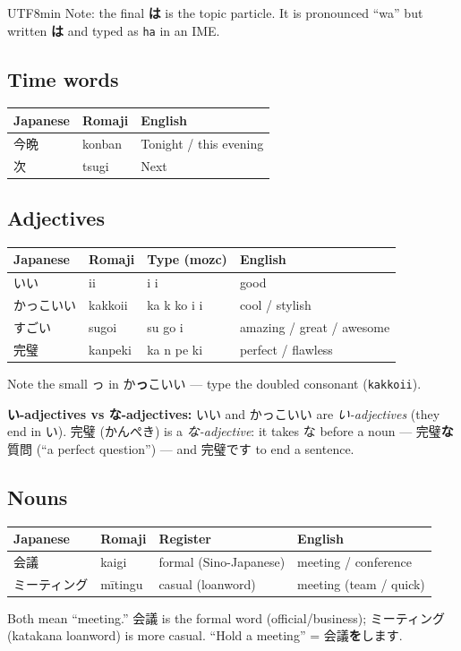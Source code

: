 \documentclass[11pt]{article}
\begin{document}
\begin{CJK}{UTF8}{min}
Note: the final \textbf{は} is the topic particle. It is pronounced ``wa'' but
written \textbf{は} and typed as \texttt{ha} in an IME.

\subsection{Time words}
\begin{center}
\begin{tabular}{@{}lll@{}}
\toprule
Japanese & Romaji & English \\
\midrule
今晩 & konban & Tonight / this evening \\
次   & tsugi  & Next \\
\bottomrule
\end{tabular}
\end{center}

\subsection{Adjectives}
\begin{center}
\begin{tabular}{@{}llll@{}}
\toprule
Japanese & Romaji & Type (mozc) & English \\
\midrule
いい     & ii      & i i        & good \\
かっこいい & kakkoii & ka k ko i i & cool / stylish \\
すごい   & sugoi   & su go i    & amazing / great / awesome \\
完璧     & kanpeki & ka n pe ki & perfect / flawless \\
\bottomrule
\end{tabular}
\end{center}
Note the small っ in か\textbf{っ}こいい --- type the doubled consonant
(\texttt{kakkoii}).

\textbf{い-adjectives vs な-adjectives:} いい and かっこいい are
\emph{い-adjectives} (they end in い). 完璧 (かんぺき) is a \emph{な-adjective}:
it takes な before a noun --- 完璧\textbf{な}質問 (``a perfect question'') --- and
完璧です to end a sentence.

\subsection{Nouns}
\begin{center}
\begin{tabular}{@{}llll@{}}
\toprule
Japanese & Romaji & Register & English \\
\midrule
会議       & kaigi   & formal (Sino-Japanese) & meeting / conference \\
ミーティング & mītingu & casual (loanword)      & meeting (team / quick) \\
\bottomrule
\end{tabular}
\end{center}
Both mean ``meeting.'' 会議 is the formal word (official/business); ミーティング
(katakana loanword) is more casual. ``Hold a meeting'' = 会議\textbf{を}します.


\end{CJK}
\end{document}
